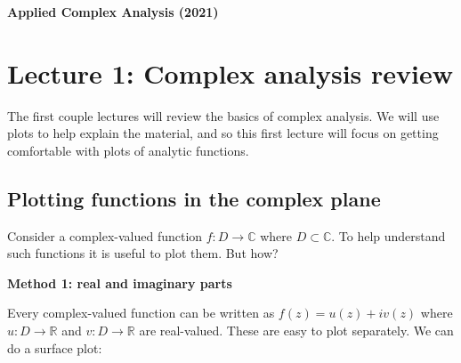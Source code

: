 \documentclass[12pt,a4paper]{article}
\begin{document}
\textbf{Applied Complex Analysis (2021)}

\section{Lecture 1: Complex analysis review}
The first  couple lectures will review the basics of complex analysis. We will use plots to help explain the material, and so this first lecture will focus on getting comfortable with plots of analytic functions.

\subsection{Plotting functions in the complex plane}
Consider a complex-valued function $f : D \rightarrow {\mathbb C}$ where $D \subset {\mathbb C}$. To help understand such functions it is useful to plot them.  But how?

\textbf{Method 1: real and imaginary parts}

Every complex-valued function can be written as $f(z) = u(z) + i v(z)$ where $u : D \rightarrow {\mathbb R}$ and $v : D \rightarrow {\mathbb R}$ are real-valued. These are easy to plot separately. We can do a surface plot:
\end{document}
